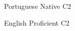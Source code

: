 


\begin{cvhonors}

  \cvhonor
    {Portuguese} %
    {} %
    {Native} %
    {C2} %

  \cvhonor
    {English} %
    {} %
    {Proficient} %
    {C2} %

\end{cvhonors}
